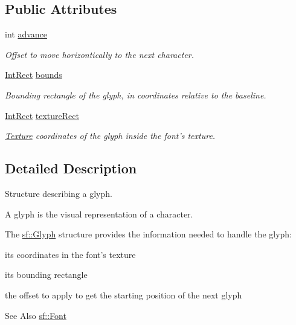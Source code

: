 \subsection*{Public Attributes}
\begin{DoxyCompactItemize}
\item 
int \hyperlink{classsf_1_1_glyph_a50b93f441db501d10308007f63382166}{advance}
\begin{DoxyCompactList}\small\item\em Offset to move horizontically to the next character. \end{DoxyCompactList}\item 
\hyperlink{namespacesf_aae67411782674934f78d55fa3af18403}{Int\-Rect} \hyperlink{classsf_1_1_glyph_afe4cd37e5839955d7dd008e178d41f0c}{bounds}
\begin{DoxyCompactList}\small\item\em Bounding rectangle of the glyph, in coordinates relative to the baseline. \end{DoxyCompactList}\item 
\hyperlink{namespacesf_aae67411782674934f78d55fa3af18403}{Int\-Rect} \hyperlink{classsf_1_1_glyph_a0d502d326449f8c49011ed91d2805f5b}{texture\-Rect}
\begin{DoxyCompactList}\small\item\em \hyperlink{classsf_1_1_texture}{Texture} coordinates of the glyph inside the font's texture. \end{DoxyCompactList}\end{DoxyCompactItemize}


\subsection{Detailed Description}
Structure describing a glyph. 

A glyph is the visual representation of a character.

The \hyperlink{classsf_1_1_glyph}{sf\-::\-Glyph} structure provides the information needed to handle the glyph\-: \begin{DoxyItemize}
\item its coordinates in the font's texture \item its bounding rectangle \item the offset to apply to get the starting position of the next glyph\end{DoxyItemize}
\begin{DoxySeeAlso}{See Also}
\hyperlink{classsf_1_1_font}{sf\-::\-Font} 
\end{DoxySeeAlso}


